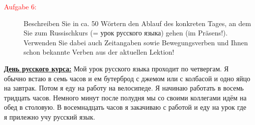 \documentclass[a4paper]{article}
\theoremstyle{plain}
\begin{document}
\begin{description}
 	\item[\textcolor{red}{Aufgabe 6:}] Beschreiben Sie in ca. 50 Wörtern den Ablauf des konkreten Tages, an dem Sie zum Russischkurs (= урок русского языка) gehen (im Präsens!). Verwenden Sie dabei auch Zeitangaben sowie Bewegungsverben und Ihnen schon bekannte Verben aus der aktuellen Lektion!
\end{description}
\vspace*{1cm}
\underline{\textbf{День русского курса:}}\s
Мой урок русского языка проходит по четвергам. Я обычно встаю в семь часов и ем бутерброд с джемом или с колбасой и одно яйцо на завтрак. Потом я еду на работу на велосипеде. Я начинаю работать в восемь тридцать часов. Немного минут после полудня мы со своими коллегами идём на обед в столовую. В восемнадцать часов я закачиваю с работой и еду на урок где я прилежно учу русский язык. 
\end{document}

